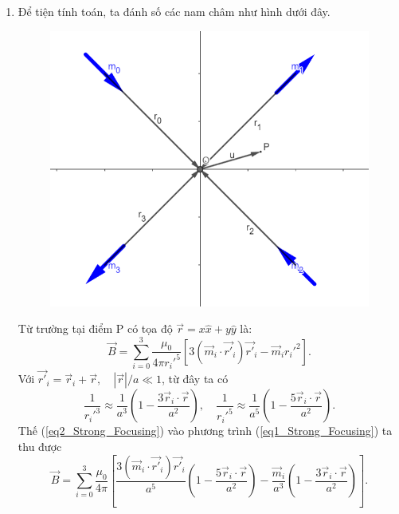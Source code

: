 \begin{enumerate}
    \item Để tiện tính toán, ta đánh số các nam châm như hình dưới đây. \\
    \begin{figure}[!ht]
        \centering
        \includegraphics[scale = .5]{Problem_18/quadrupole.png}
    \end{figure}
    Từ trường tại điểm P có tọa độ $\Vec{r} = x\hat{x}+y\hat{y}$ là:
    \begin{equation} \label{eq1_Strong_Focusing}
        \Vec{B}= \sum_{i=0}^{3} \frac{\mu_0}{4\pi r_i'^5}\left[3(\Vec{m}_i\cdot \Vec{r'}_i)\Vec{r'}_i-\Vec{m}_i r_i'^2\right].
    \end{equation}
    Với $\Vec{r'}_i= \Vec{r}_i+\Vec{r}, \quad |\Vec{r}|/a \ll 1$, từ đây ta có
    \begin{equation} \label{eq2_Strong_Focusing}
        \frac{1}{r_i'^3}\approx\frac{1}{a^3}\left(1-\frac{3\Vec{r}_i \cdot \Vec{r}}{a^2}\right), \quad  \frac{1}{r_i'^5}\approx\frac{1}{a^5}\left(1-\frac{5\Vec{r}_i\cdot \Vec{r}}{a^2}\right).
    \end{equation}
        Thế (\ref{eq2_Strong_Focusing}) vào phương trình (\ref{eq1_Strong_Focusing}) ta thu được
    \begin{equation} \label{eq3_Strong_Focusing}
            \Vec{B} = \sum_{i=0}^{3} \frac{\mu_0}{4\pi}\left[\frac{3(\Vec{m}_i\cdot \Vec{r'}_i)\Vec{r'}_i}{a^5}\left(1-\frac{5\Vec{r}_i \cdot \Vec{r}}{a^2}\right)-\frac{\Vec{m}_i}{a^3}\left(1-\frac{3\Vec{r}_i \cdot \Vec{r}}{a^2}\right)\right].

\end{equation}
\end{enumerate}
